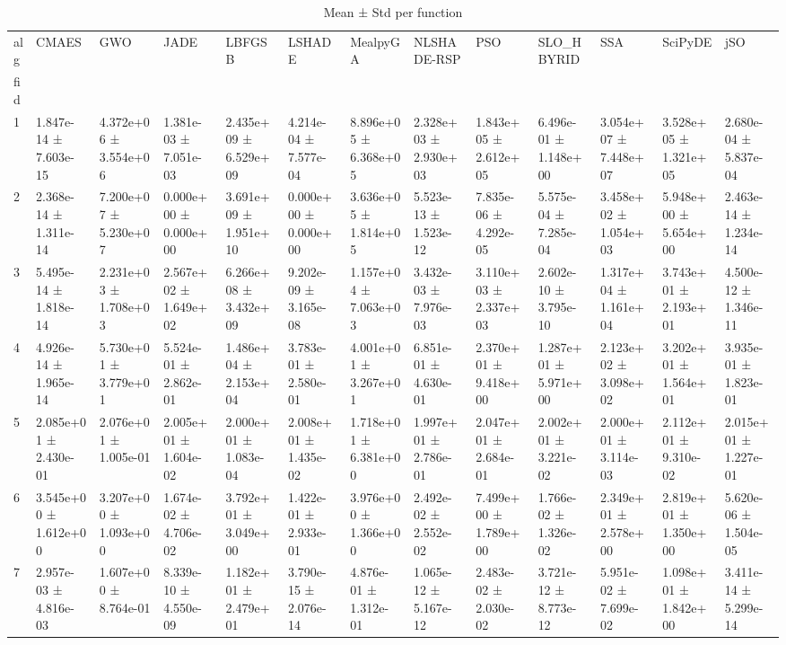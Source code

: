 \begin{table}
\caption{Mean ± Std per function}
\label{tab:meanstd_all}
\begin{tabular}{lllllllllllll}
\toprule
alg & CMAES & GWO & JADE & LBFGSB & LSHADE & MealpyGA & NLSHADE-RSP & PSO & SLO_HBYRID & SSA & SciPyDE & jSO \\
fid &  &  &  &  &  &  &  &  &  &  &  &  \\
\midrule
1 & 1.847e-14 ± 7.603e-15 & 4.372e+06 ± 3.554e+06 & 1.381e-03 ± 7.051e-03 & 2.435e+09 ± 6.529e+09 & 4.214e-04 ± 7.577e-04 & 8.896e+05 ± 6.368e+05 & 2.328e+03 ± 2.930e+03 & 1.843e+05 ± 2.612e+05 & 6.496e-01 ± 1.148e+00 & 3.054e+07 ± 7.448e+07 & 3.528e+05 ± 1.321e+05 & 2.680e-04 ± 5.837e-04 \\
2 & 2.368e-14 ± 1.311e-14 & 7.200e+07 ± 5.230e+07 & 0.000e+00 ± 0.000e+00 & 3.691e+09 ± 1.951e+10 & 0.000e+00 ± 0.000e+00 & 3.636e+05 ± 1.814e+05 & 5.523e-13 ± 1.523e-12 & 7.835e-06 ± 4.292e-05 & 5.575e-04 ± 7.285e-04 & 3.458e+02 ± 1.054e+03 & 5.948e+00 ± 5.654e+00 & 2.463e-14 ± 1.234e-14 \\
3 & 5.495e-14 ± 1.818e-14 & 2.231e+03 ± 1.708e+03 & 2.567e+02 ± 1.649e+02 & 6.266e+08 ± 3.432e+09 & 9.202e-09 ± 3.165e-08 & 1.157e+04 ± 7.063e+03 & 3.432e-03 ± 7.976e-03 & 3.110e+03 ± 2.337e+03 & 2.602e-10 ± 3.795e-10 & 1.317e+04 ± 1.161e+04 & 3.743e+01 ± 2.193e+01 & 4.500e-12 ± 1.346e-11 \\
4 & 4.926e-14 ± 1.965e-14 & 5.730e+01 ± 3.779e+01 & 5.524e-01 ± 2.862e-01 & 1.486e+04 ± 2.153e+04 & 3.783e-01 ± 2.580e-01 & 4.001e+01 ± 3.267e+01 & 6.851e-01 ± 4.630e-01 & 2.370e+01 ± 9.418e+00 & 1.287e+01 ± 5.971e+00 & 2.123e+02 ± 3.098e+02 & 3.202e+01 ± 1.564e+01 & 3.935e-01 ± 1.823e-01 \\
5 & 2.085e+01 ± 2.430e-01 & 2.076e+01 ± 1.005e-01 & 2.005e+01 ± 1.604e-02 & 2.000e+01 ± 1.083e-04 & 2.008e+01 ± 1.435e-02 & 1.718e+01 ± 6.381e+00 & 1.997e+01 ± 2.786e-01 & 2.047e+01 ± 2.684e-01 & 2.002e+01 ± 3.221e-02 & 2.000e+01 ± 3.114e-03 & 2.112e+01 ± 9.310e-02 & 2.015e+01 ± 1.227e-01 \\
6 & 3.545e+00 ± 1.612e+00 & 3.207e+00 ± 1.093e+00 & 1.674e-02 ± 4.706e-02 & 3.792e+01 ± 3.049e+00 & 1.422e-01 ± 2.933e-01 & 3.976e+00 ± 1.366e+00 & 2.492e-02 ± 2.552e-02 & 7.499e+00 ± 1.789e+00 & 1.766e-02 ± 1.326e-02 & 2.349e+01 ± 2.578e+00 & 2.819e+01 ± 1.350e+00 & 5.620e-06 ± 1.504e-05 \\
7 & 2.957e-03 ± 4.816e-03 & 1.607e+00 ± 8.764e-01 & 8.339e-10 ± 4.550e-09 & 1.182e+01 ± 2.479e+01 & 3.790e-15 ± 2.076e-14 & 4.876e-01 ± 1.312e-01 & 1.065e-12 ± 5.167e-12 & 2.483e-02 ± 2.030e-02 & 3.721e-12 ± 8.773e-12 & 5.951e-02 ± 7.699e-02 & 1.098e+01 ± 1.842e+00 & 3.411e-14 ± 5.299e-14 \\

\end{tabular}
\end{table}
